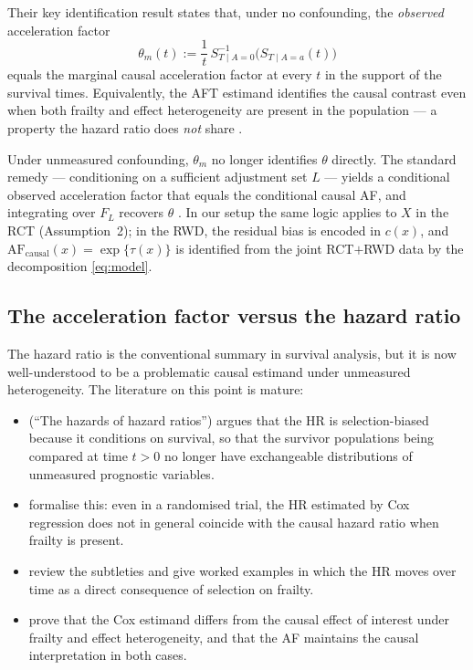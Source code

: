 \documentclass[11pt]{article}
\theoremstyle{plain}
\theoremstyle{definition}
\theoremstyle{remark}
\newcommand{\1}{\mathds{1}}
\newcommand{\tauf}{\tau}
\newcommand{\cf}{c}
\newcommand{\AF}{\mathrm{AF}}
\begin{document}
Their key identification result \citep[Theorem~3.1]{Brathovde2024} states
that, under no confounding, the \emph{observed} acceleration factor
\begin{equation}
  \theta_{m}(t) := \frac{1}{t}\,
  S^{-1}_{T \mid A=0}\!\bigl(S_{T \mid A=a}(t)\bigr)
\end{equation}
equals the marginal causal acceleration factor at every $t$ in the support
of the survival times. Equivalently, the AFT estimand identifies the
causal contrast even when both frailty and effect heterogeneity are
present in the population --- a property the hazard ratio does \emph{not}
share \citep[see also][]{hernan2010, MartinussenVansteelandtAndersen2020,
Post2024b}.

Under unmeasured confounding, $\theta_{m}$ no longer identifies $\theta$
directly. The standard remedy --- conditioning on a sufficient adjustment
set $L$ --- yields a conditional observed acceleration factor that equals
the conditional causal AF, and integrating over $F_{L}$ recovers $\theta$
\citep{Brathovde2024}. In our setup the same logic applies to $X$ in the
RCT (Assumption~2); in the RWD, the residual bias is encoded in $\cf(x)$,
and $\AF_{\mathrm{causal}}(x) = \exp\{\tauf(x)\}$ is identified from the
joint RCT$+$RWD data by the decomposition \eqref{eq:model}.

\subsection{The acceleration factor versus the hazard ratio}

The hazard ratio is the conventional summary in survival analysis, but it
is now well-understood to be a problematic causal estimand under
unmeasured heterogeneity. The literature on this point is mature:

\begin{itemize}[leftmargin=*]
  \item \citet{hernan2010} (``The hazards of hazard ratios'') argues that
        the HR is selection-biased because it conditions on survival,
        so that the survivor populations being compared at time $t > 0$
        no longer have exchangeable distributions of unmeasured
        prognostic variables.
  \item \citet{Aalen2015} formalise this: even in a randomised
        trial, the HR estimated by Cox regression does not in general
        coincide with the causal hazard ratio when frailty is present.
  \item \citet{MartinussenVansteelandtAndersen2020} review the subtleties
        and give worked examples in which the HR moves over time as a
        direct consequence of selection on frailty.
  \item \citet{Post2024b} prove that the Cox estimand differs from the
        causal effect of interest under frailty and effect heterogeneity,
        and that the AF maintains the causal interpretation in both
        cases.
\end{itemize}
\end{document}

